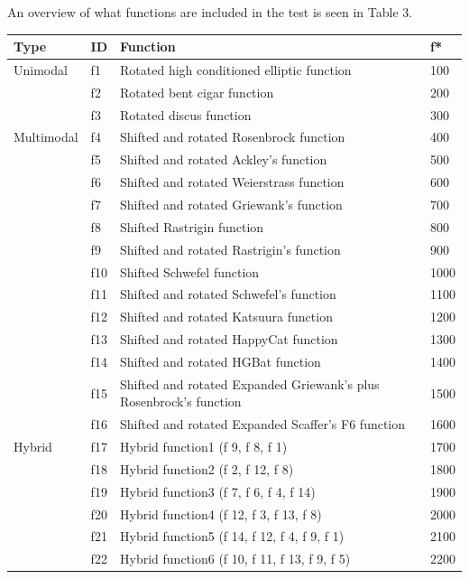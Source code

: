 \clearpage

An overview of what functions are included in the test is seen in Table 3.

\begin{table}[]
\begin{tabular}{llll}
  \textbf{Type}
    & \textbf{ID} & \textbf{Function} & \textbf{f*} \\ \hline
  Unimodal
    & f1 & Rotated high conditioned elliptic function & 100 \\
    & f2 & Rotated bent cigar function & 200 \\
    & f3 & Rotated discus function & 300 \\
  Multimodal
    & f4 & Shifted and rotated Rosenbrock function & 400 \\
    & f5 & Shifted and rotated Ackley's function & 500 \\
    & f6 & Shifted and rotated Weierstrass function & 600 \\
    & f7 & Shifted and rotated Griewank's function & 700 \\
    & f8 & Shifted Rastrigin function & 800 \\
    & f9 & Shifted and rotated Rastrigin's function & 900 \\
    & f10 & Shifted Schwefel function & 1000 \\
    & f11 & Shifted and rotated Schwefel's function & 1100 \\
    & f12 & Shifted and rotated Katsuura function & 1200 \\
    & f13 & Shifted and rotated HappyCat function & 1300 \\
    & f14 & Shifted and rotated HGBat function & 1400 \\
    & f15 & Shifted and rotated Expanded Griewank's plus Rosenbrock's function & 1500 \\
    & f16 & Shifted and rotated Expanded Scaffer's F6 function & 1600 \\
  Hybrid
    & f17 & Hybrid function1 (f 9, f 8, f 1) & 1700 \\
    & f18 & Hybrid function2 (f 2, f 12, f 8) & 1800 \\
    & f19 & Hybrid function3 (f 7, f 6, f 4, f 14) & 1900 \\
    & f20 & Hybrid function4 (f 12, f 3, f 13, f 8) & 2000 \\
    & f21 & Hybrid function5 (f 14, f 12, f 4, f 9, f 1) & 2100 \\
    & f22 & Hybrid function6 (f 10, f 11, f 13, f 9, f 5) & 2200 \\

\end{tabular}
\end{table}
